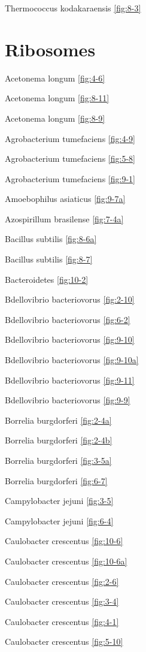 \documentclass[]{tufte-book}
\begin{document}
Thermococcus kodakaraensis \ref{fig:8-3}

\section{\texorpdfstring{\textbf{Ribosomes}}{Ribosomes}}\label{ribosomes}

Acetonema longum \ref{fig:4-6}

Acetonema longum \ref{fig:8-11}

Acetonema longum \ref{fig:8-9}

Agrobacterium tumefaciens \ref{fig:4-9}

Agrobacterium tumefaciens \ref{fig:5-8}

Agrobacterium tumefaciens \ref{fig:9-1}

Amoebophilus asiaticus \ref{fig:9-7a}

Azospirillum brasilense \ref{fig:7-4a}

Bacillus subtilis \ref{fig:8-6a}

Bacillus subtilis \ref{fig:8-7}

Bacteroidetes \ref{fig:10-2}

Bdellovibrio bacteriovorus \ref{fig:2-10}

Bdellovibrio bacteriovorus \ref{fig:6-2}

Bdellovibrio bacteriovorus \ref{fig:9-10}

Bdellovibrio bacteriovorus \ref{fig:9-10a}

Bdellovibrio bacteriovorus \ref{fig:9-11}

Bdellovibrio bacteriovorus \ref{fig:9-9}

Borrelia burgdorferi \ref{fig:2-4a}

Borrelia burgdorferi \ref{fig:2-4b}

Borrelia burgdorferi \ref{fig:3-5a}

Borrelia burgdorferi \ref{fig:6-7}

Campylobacter jejuni \ref{fig:3-5}

Campylobacter jejuni \ref{fig:6-4}

Caulobacter crescentus \ref{fig:10-6}

Caulobacter crescentus \ref{fig:10-6a}

Caulobacter crescentus \ref{fig:2-6}

Caulobacter crescentus \ref{fig:3-4}

Caulobacter crescentus \ref{fig:4-1}

Caulobacter crescentus \ref{fig:5-10}
\end{document}

